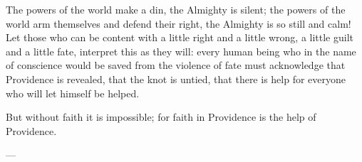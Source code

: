 \documentclass[12pt,a4paper,openany]{book}
\begin{document}
The powers of the world make a din, the Almighty is silent;
the powers of the world arm themselves and defend their
right, the Almighty is so still and calm!
Let those who can be content with a little right and
a little wrong, a little guilt and a little fate, interpret
this as they will: every human being who in the name of conscience
would be saved from the violence of fate
must acknowledge that Providence is revealed,
that the knot is untied, that there is help for everyone
who will let himself be helped.

But without faith it is impossible; for faith
in Providence is the help of Providence.

\begin{center}---\end{center}
\end{document}
